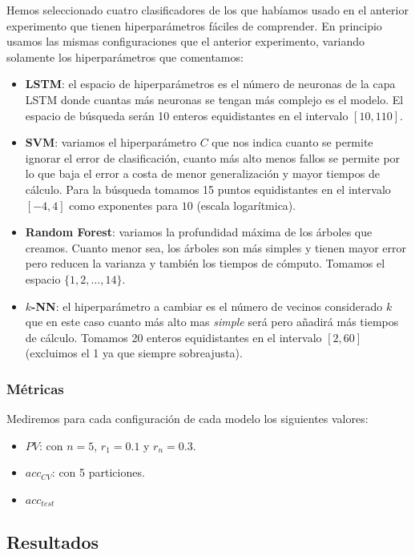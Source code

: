 Hemos seleccionado cuatro clasificadores de los que habíamos usado en el anterior experimento que tienen hiperparámetros fáciles de comprender. En principio usamos las mismas configuraciones que el anterior experimento, variando solamente los hiperparámetros que comentamos:

\begin{itemize}
  \item \textbf{LSTM}: el espacio de hiperparámetros es el número de neuronas de la capa LSTM donde cuantas más neuronas se tengan más complejo es el modelo. El espacio de búsqueda serán 10 enteros equidistantes en el intervalo $[10, 110]$.
  \item \textbf{SVM}: variamos el hiperparámetro $C$ que nos indica cuanto se permite ignorar el error de clasificación, cuanto más alto menos fallos se permite por lo que baja el error a costa de menor generalización y mayor tiempos de cálculo. Para la búsqueda tomamos 15 puntos equidistantes en el intervalo $[-4, 4]$ como exponentes para $10$ (escala logarítmica).
  \item \textbf{Random Forest}: variamos la profundidad máxima de los árboles que creamos. Cuanto menor sea, los árboles son más simples y tienen mayor error pero reducen la varianza y también los tiempos de cómputo. Tomamos el espacio $\{1, 2, \ldots, 14\}$.
  \item \textbf{$k$-NN}: el hiperparámetro a cambiar es el número de vecinos considerado $k$ que en este caso cuanto más alto mas \emph{simple} será pero añadirá más tiempos de cálculo. Tomamos 20 enteros equidistantes en el intervalo $[2, 60]$ (excluimos el 1 ya que siempre sobreajusta).
\end{itemize}

\subsubsection{Métricas}

Mediremos para cada configuración de cada modelo los siguientes valores:
\begin{itemize}
  \item $PV$: con $n = 5$, $r_1 = 0.1$ y $r_n = 0.3$.
  \item $acc_{CV}$: con 5 particiones.
  \item $acc_{test}$
\end{itemize}

\subsection{Resultados}


